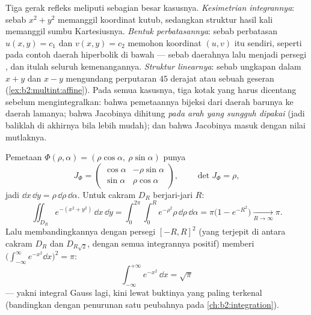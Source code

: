 \begin{remark}
Tiga gerak refleks meliputi sebagian besar kasusnya. \emph{Kesimetrian
integrannya}: sebab $x^2 + y^2$ memanggil koordinat kutub, sedangkan struktur hasil kali
memanggil sumbu Kartesiusnya. \emph{Bentuk
perbatasannya}: sebab perbatasan $u(x,y) = c_1$ dan $v(x,y) = c_2$ memohon
koordinat $(u, v)$ itu sendiri, seperti pada contoh daerah
hiperbolik di bawah --- sebab daerahnya lalu menjadi persegi ,
dan itulah seluruh kemenangannya. \emph{Struktur linearnya}:
sebab ungkapan dalam $x + y$ dan $x - y$ mengundang perputaran
$45$ derajat atau sebuah geseran (\cref{ex:b2:multint:affine}). Pada semua
kasusnya, tiga kotak yang harus dicentang sebelum mengintegralkan: bahwa pemetaannya
bijeksi dari daerah barunya ke daerah lamanya; bahwa Jacobinya
dihitung \emph{pada arah yang sungguh dipakai} (jadi baliklah di
akhirnya bila lebih mudah); dan bahwa Jacobinya masuk dengan
nilai mutlaknya.
\end{remark}

\begin{example}\label{ex:b2:multint:polar}
Pemetaan $\Phi(\rho, \alpha) = (\rho\cos\alpha,\ \rho\sin\alpha)$ punya
\[
J_\Phi = \begin{pmatrix}
\cos\alpha & -\rho\sin\alpha\\
\sin\alpha & \rho\cos\alpha
\end{pmatrix},
\qquad \det J_\Phi = \rho ,
\]
jadi $\dd x\,\dd y = \rho\,\dd\rho\,\dd\alpha$. Untuk cakram $D_R$
berjari-jari $R$:
\[
\iint_{D_R} e^{-(x^2 + y^2)}\,\dd x\,\dd y
= \int_0^{2\pi}\!\!\int_0^R e^{-\rho^2}\rho\,\dd\rho\,\dd\alpha
= \pi\bigl(1 - e^{-R^2}\bigr)
\xrightarrow[R\to\infty]{} \pi .
\]
Lalu membandingkannya dengan persegi $[-R, R]^2$ (yang terjepit di antara
cakram $D_R$ dan $D_{R\sqrt2}$, dengan semua integrannya positif) memberi
$\bigl(\int_{-\infty}^\infty e^{-x^2}\dd x\bigr)^2 = \pi$:
\[
\boxed{\ \int_{-\infty}^{+\infty} e^{-x^2}\,\dd x = \sqrt{\pi}\ }
\]
--- yakni integral Gauss lagi, kini lewat buktinya yang paling terkenal
(bandingkan dengan penurunan satu peubahnya pada
\cref{ch:b2:integration}).
\end{example}

